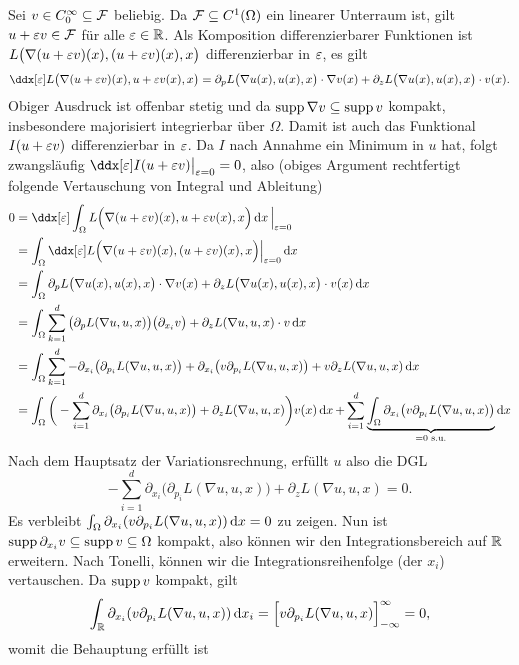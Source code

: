 \documentclass{myexercise}
\begin{document}
\begin{exercise}[Aufgabe 1]
	Sei $v \in C_0^\infty \subseteq \mathcal{F}$ beliebig.
	Da $\mathcal{F} \subseteq C^1(\Omega)$ ein linearer Unterraum ist, gilt $u + \varepsilon v \in \mathcal{F}$ für alle $\varepsilon \in \mathbb{R}$.
	Als Komposition differenzierbarer Funktionen ist $L\big(\nabla(u+\varepsilon v)(x), (u+\varepsilon v)(x), x\big)$ differenzierbar in $\varepsilon$, es gilt
	\[
		\ddx[\eps] L\big(\nabla(u+\eps v)(x), u+\eps v(x), x\big)
		= \partial_p L\big(\nabla u(x), u(x), x\big) \cdot \nabla v(x) + \partial_z L\big(\nabla u(x), u(x), x\big) \cdot v(x).
	\]
	Obiger Ausdruck ist offenbar stetig und da $\operatorname{supp} \nabla v \subseteq \operatorname{supp} v$ kompakt, insbesondere majorisiert integrierbar über $\Omega$.
	Damit ist auch das Funktional $I(u+\varepsilon v)$ differenzierbar in $\varepsilon$.
	Da $I$ nach Annahme ein Minimum in $u$ hat, folgt zwangsläufig $\ddx[\eps] I(u+\eps v)\big|_{\eps = 0} = 0$, also (obiges Argument rechtfertigt folgende Vertauschung von Integral und Ableitung)
	\begin{align*}
		0
		&= \ddx[\eps] \int_\Omega L\Big(\nabla(u+\eps v)(x), u+\eps v(x), x\Big) \di[x] \Big|_{\eps=0} \\
		&= \int_\Omega \ddx[\epsilon] L\Big(\nabla(u+\epsilon v)(x), (u+\epsilon v)(x), x\Big) \Big|_{\epsilon=0} \di[x] \\
		&= \int_\Omega \partial_p L\big(\nabla u(x), u(x), x\big) \cdot \nabla v(x) + \partial_z L\big(\nabla u(x), u(x), x\big) \cdot v(x) \di[x] \\
		&= \int_\Omega \sum_{k=1}^d \big(\partial_p L(\nabla u, u, x)\big) \big(\partial_{x_i} v\big) + \partial_z L(\nabla u, u, x) \cdot v \di[x] \\
		&= \int_\Omega \sum_{k=1}^d -\partial_{x_i} \big(\partial_{p_i} L(\nabla u, u, x)\big) + \partial_{x_i}\big( v \partial_{p_i} L(\nabla u, u, x)\big) + v  \partial_z L(\nabla u, u, x) \di[x] \\
		&= \int_\Omega \bigg( - \sum_{i=1}^d \partial_{x_i} \big( \partial_{p_i} L(\nabla u, u, x) \big) + \partial_z L(\nabla u, u, x) \bigg) v(x) \di[x] + \sum_{i=1}^d \underbrace{\int_\Omega \partial_{x_i} \big(v \partial_{p_i} L(\nabla u, u, x) \big)}_{=0 \text{ s.u.}} \di[x]
	\end{align*}
	Nach dem Hauptsatz der Variationsrechnung, erfüllt $u$ also die DGL
	\[
		- \sum_{i=1}^d \partial_{x_i} \big( \partial_{p_i} L(\nabla u, u, x) \big) + \partial_z L(\nabla u, u, x) = 0.
	\]
	Es verbleibt $\int_\Omega \partial_{x_i}(v \partial_{p_i} L(\nabla u, u, x)) \di[x] = 0$ zu zeigen.
	Nun ist $\operatorname{supp} \partial_{x_i} v \subseteq \operatorname{supp} v \subseteq \Omega$ kompakt, also können wir den Integrationsbereich auf $\mathbb{R}$ erweitern.
	Nach Tonelli, können wir die Integrationsreihenfolge (der $x_i$) vertauschen.
	Da $\operatorname{supp} v$ kompakt, gilt
	\[
		\int_\R \partial_{x_i}(v \partial_{p_i} L(\nabla u, u, x)) \di[x_i]
		= \Big[v \partial_{p_i} L(\nabla u, u, x) \Big]_{-\infty}^{\infty}
		= 0,
	\]
	womit die Behauptung erfüllt ist
\end{exercise}
\end{document}
